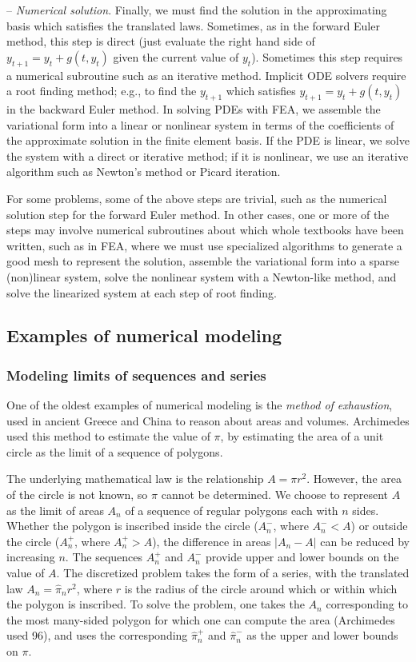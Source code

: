 \documentclass{puthesis}
\begin{document}
-- \emph{Numerical solution}. Finally, we must find the solution in the approximating basis
which satisfies the translated laws.
Sometimes, as in the forward Euler method, this step
is direct (just evaluate the right hand side of $y_{t+1} = y_t + g(t, y_t)$ given the current
value of $y_t$).
Sometimes this step requires a numerical subroutine such as an iterative method.
Implicit ODE solvers require a
root finding method; e.g., to find the $y_{t+1}$ which satisfies
$y_{t+1} = y_t + g(t, y_t)$ in the backward Euler method.
In solving PDEs with FEA, we assemble the variational form into a linear or nonlinear system
in terms of the coefficients of the approximate solution in the finite element basis.
If the PDE is linear, we solve the system with a direct or iterative method; if it is
nonlinear, we use an iterative algorithm such as Newton's method or Picard iteration.

For some problems, some of the above steps are trivial, such as
the numerical solution step for the forward Euler method. In other cases,
one or more of the steps may involve numerical subroutines about which whole
textbooks have been written, such as in
FEA, where we must use specialized algorithms to generate a good mesh to represent
the solution, assemble the
variational form into a sparse (non)linear system,
solve the nonlinear system with a
Newton-like method, and solve the linearized system at each step of root finding.

\subsection{Examples of numerical modeling}

\subsubsection{Modeling limits of sequences and series}
One of the oldest examples of numerical modeling is the
\emph{method of exhaustion}, used in ancient Greece and
China to reason about areas and volumes. Archimedes
used this method to estimate the value of $\pi$, by estimating the
area of a unit circle as the limit of a sequence of polygons.

The underlying mathematical law is the relationship $A = \pi r^2$.
However, the area of the circle is not known, so $\pi$ cannot be
determined.
We choose to represent $A$ as the limit of areas $A_n$ of a sequence of
regular polygons each with $n$ sides. Whether the polygon is inscribed
inside the circle ($A^-_n$, where $A^-_n < A$) or outside the circle ($A^+_n$, where $A^+_n > A$), the
difference in areas $|A_n - A|$ can be reduced by increasing $n$.
The sequences $A^+_n$ and $A^-_n$ provide upper and lower bounds on the
value of $A$.
The discretized problem takes the form of a series, with the translated
law $A_n = \hat{\pi}_n r^2$, where $r$ is the radius of the circle
around which or within which the polygon is inscribed.
To solve the problem, one takes the $A_n$ corresponding to
the most many-sided polygon for which one can compute the area
(Archimedes used 96), and uses the
corresponding $\hat{\pi}^+_n$ and $\hat{\pi}^-_n$ as the upper and lower bounds on $\pi$.
\end{document}
